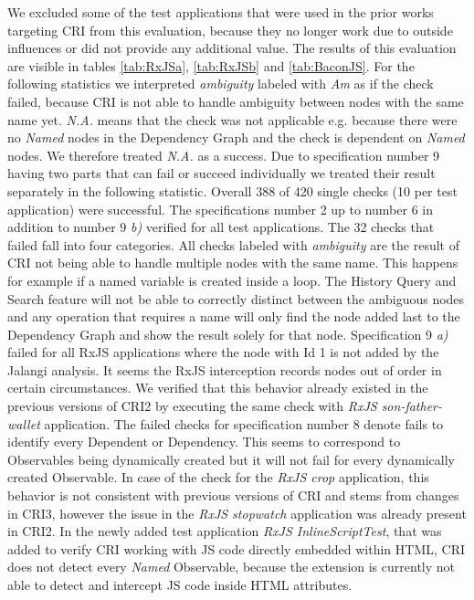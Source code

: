We excluded some of the test applications that were used in the prior works targeting CRI from this evaluation, because they no longer work due to outside influences or did not provide any additional value. The results of this evaluation are visible in tables \ref{tab:RxJSa}, \ref{tab:RxJSb} and \ref{tab:BaconJS}. For the following statistics we interpreted \emph{ambiguity} labeled with \emph{Am} as if the check failed, because CRI is not able to handle ambiguity between nodes with the same name yet. \emph{N.A.} means that the check was not applicable e.g. because there were no \emph{Named} nodes in the Dependency Graph and the check is dependent on \emph{Named} nodes. We therefore treated \emph{N.A.} as a success. Due to specification number 9 having two parts that can fail or succeed individually we treated their result separately in the following statistic. Overall 388 of 420 single checks (10 per test application) were successful. The specifications number 2 up to number 6 in addition to number 9 \emph{b)} verified for all test applications. The 32 checks that failed fall into four categories. All checks labeled with \emph{ambiguity} are the result of CRI not being able to handle multiple nodes with the same name. This happens for example if a named variable is created inside a loop. The History Query and Search feature will not be able to correctly distinct between the ambiguous nodes and any operation that requires a name will only find the node added last to the Dependency Graph and show the result solely for that node. Specification 9 \emph{a)} failed for all RxJS applications where the node with Id 1 is not added by the Jalangi analysis. It seems the RxJS interception records nodes out of order in certain circumstances. We verified that this behavior already existed in the previous versions of CRI2 by executing the same check with \emph{RxJS son-father-wallet} application. The failed checks for specification number 8 denote fails to identify every Dependent or Dependency. This seems to correspond to Observables being dynamically created but it will not fail for every dynamically created Observable. In case of the check for the \emph{RxJS crop} application, this behavior is not consistent with previous versions of CRI and stems from changes in CRI3, however the issue in the \emph{RxJS stopwatch} application was already present in CRI2.
In the newly added test application \emph{RxJS InlineScriptTest}, that was added to verify CRI working with JS code directly embedded within HTML, CRI does not detect every \emph{Named} Observable, because the extension is currently not able to detect and intercept JS code inside HTML attributes.
